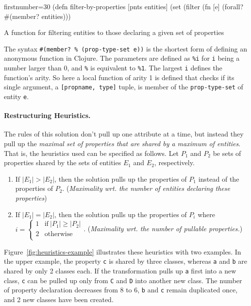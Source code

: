 \documentclass[submission]{eptcs}
\begin{document}
\begin{listing}[htbp]
  \begin{clojurecode*}{firstnumber=30}
(defn filter-by-properties [pnts entities]
  (set (filter (fn [e]
                 (forall? #(member? %
               entities)))
  \end{clojurecode*}
  \caption{A function for filtering entities to those declaring a given set of
    properties}
  \label{lst:filter-by-properties}
\end{listing}


The syntax \verb|#(member? % (prop-type-set e))| is the shortest form of
defining an anonymous function in Clojure.  The parameters are defined as
\verb|%i| for \verb|i| being
a number larger than 0, and \verb|%| is equivalent
to \verb|%1|.  The largest \verb|i| defines the function's arity.  So here a
local function of arity 1 is defined that checks if its single argument, a
\verb|[propname, type]| tuple, is member of the \verb|prop-type-set| of entity
\verb|e|.


\paragraph{Restructuring Heuristics.}

The rules of this solution don't pull up one attribute at a time, but instead
they pull up the \emph{maximal set of properties that are shared by a maximum
  of entities}.  That is, the heuristics used can be specified as follows.  Let
$P_1$ and $P_2$ be sets of properties shared by the sets of entities $E_1$ and
$E_2$, respectively.

\begin{enumerate}
\item If $|E_1| > |E_2|$, then the solution pulls up the properties of $P_1$
  instead of the properties of $P_2$.  (\emph{Maximality wrt. the number of
    entities declaring these properties})
\item If $|E_1| = |E_2|$, then the solution pulls up the properties of $P_i$
  where~$i = \left\{\begin{array}{ll}1 & \text{if}~|P_1| \geq |P_2|\\2 &
      \text{otherwise}\\ \end{array}\right.$.  (\emph{Maximality wrt. the
    number of pullable properties.})
\end{enumerate}

Figure~\ref{fig:heuristics-example} illustrates these heuristics with two
examples.  In the upper example, the property \verb|c| is shared by three
classes, whereas \verb|a| and \verb|b| are shared by only 2 classes each.  If
the transformation pulls up \verb|a| first into a new class, \verb|c| can be
pulled up only from \verb|C| and \verb|D| into another new class.  The number
of property declaration decreases from 8 to 6, \verb|b| and \verb|c| remain
duplicated once, and 2 new classes have been created.
\end{document}
